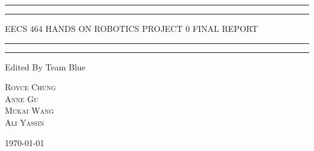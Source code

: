 \documentclass[a4paper, 12pt, oneside]{article} %
\begin{document}
 

\begin{titlepage} %

	\centering %
	
	\scshape %
	
	\vspace*{2\baselineskip} %
	
	
	\rule{\textwidth}{1.6pt}\vspace*{-\baselineskip}\vspace*{2pt} %
	\rule{\textwidth}{0.4pt} %
	
	\vspace{0.75\baselineskip} %
	
	{\LARGE EECS 464 HANDS ON ROBOTICS\vskip 0.2in PROJECT 0 FINAL REPORT} %
	
	\vspace{0.75\baselineskip} %
	
	\rule{\textwidth}{0.4pt}\vspace*{-\baselineskip}\vspace{3.2pt} %
	\rule{\textwidth}{1.6pt} %
	
	\vspace{7\baselineskip} %
	
	
	
	Edited By Team Blue
	
	\vspace{0.5\baselineskip} %
	
	{\scshape\Large Royce Chung \\ Anne Gu \\ Mukai Wang \\ Ali Yassin} %
	
	\vfill

	
	\today
	

	

\end{titlepage}
\begin{spacing}{1.5}
\tableofcontents
\end{spacing}
\newpage
\setcounter{page}{1}
\end{document}
